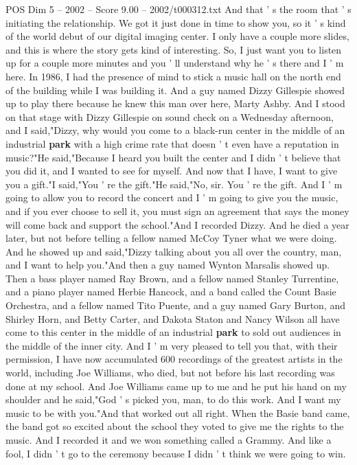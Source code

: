 \begin{textsample}{POS Dim 5 – 2002 – Score 9.00 – 2002/t000312.txt}
And that ' s the room that ' s initiating the relationship.
We got it just done in time to show you, so it ' s kind of the world debut of our digital imaging center.
I only have a couple more slides, and this is where the story gets kind of interesting.
So, I just want you to listen up for a couple more minutes and you ' ll understand why he ' s there and I ' m here.
In 1986, I had the presence of mind to stick a music hall on the north end of the building while I was building it.
And a guy named Dizzy Gillespie showed up to play there because he knew this man over here, Marty Ashby.
And I stood on that stage with Dizzy Gillespie on sound check on a Wednesday afternoon, and I said,"Dizzy, why would you come to a black-run center in the middle of an industrial \textbf{park} with a high crime rate that doesn ' t even have a reputation in music?"He said,"Because I heard you built the center and I didn ' t believe that you did it, and I wanted to see for myself.
And now that I have, I want to give you a gift."I said,"You ' re the gift."He said,"No, sir.
You ' re the gift.
And I ' m going to allow you to record the concert and I ' m going to give you the music, and if you ever choose to sell it, you must sign an agreement that says the money will come back and support the school."And I recorded Dizzy.
And he died a year later, but not before telling a fellow named McCoy Tyner what we were doing.
And he showed up and said,"Dizzy talking about you all over the country, man, and I want to help you."And then a guy named Wynton Marsalis showed up.
Then a bass player named Ray Brown, and a fellow named Stanley Turrentine, and a piano player named Herbie Hancock, and a band called the Count Basie Orchestra, and a fellow named Tito Puente, and a guy named Gary Burton, and Shirley Horn, and Betty Carter, and Dakota Staton and Nancy Wilson all have come to this center in the middle of an industrial \textbf{park} to sold out audiences in the middle of the inner city.
And I ' m very pleased to tell you that, with their permission, I have now accumulated 600 recordings of the greatest artists in the world, including Joe Williams, who died, but not before his last recording was done at my school.
And Joe Williams came up to me and he put his hand on my shoulder and he said,"God ' s picked you, man, to do this work.
And I want my music to be with you."And that worked out all right.
When the Basie band came, the band got so excited about the school they voted to give me the rights to the music.
And I recorded it and we won something called a Grammy.
And like a fool, I didn ' t go to the ceremony because I didn ' t think we were going to win.

\end{textsample}
